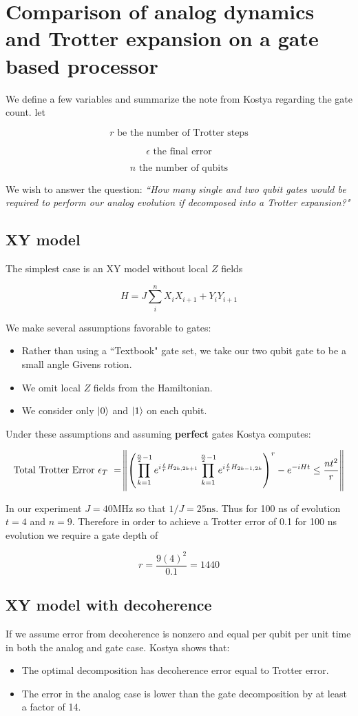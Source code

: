 \documentclass{article}
\DeclareRobustCommand{\qeqn}[1]{
\begin{equation}
    #1
\end{equation}
}
\begin{document}
\section{Comparison of analog dynamics and Trotter expansion on a gate based processor}
We define a few variables and summarize the note from Kostya regarding the gate count.
let
\qeqn{r \text{ be the number of Trotter steps}}
\qeqn{\epsilon \text{ the final error}}
\qeqn{n \text{ the number of qubits}}

We wish to answer the question:
\textit{``How many single and two qubit gates would be required to perform our analog evolution if decomposed into a Trotter expansion?"}

\subsection{XY model}

The simplest case is an XY model without local $Z$ fields
\qeqn{H = J \sum_i^n X_i X_{i+1} + Y_i Y_{i+1} }
We make several assumptions favorable to gates:
\begin{itemize}
\item Rather than using a ``Textbook" gate set, we take our two qubit gate to be a small angle Givens rotion.
\item We omit local $Z$ fields from the Hamiltonian.
\item We consider only $\ket{0}$ and $\ket{1}$ on each qubit.
\end{itemize}
Under these assumptions and assuming \textbf{perfect} gates Kostya computes:
\qeqn{\text{Total Trotter Error $\epsilon_{T}$ } =
\norm{
\left(
\prod_{k=1}^{\frac{n}{2}-1} e^{i \frac{t}{r} H_{2k,2k+1} }
\prod_{k=1}^{\frac{n}{2}-1} e^{i \frac{t}{r} H_{2k-1,2k} }
\right)^{r}
- e^{- i H t}
\leq
\frac{n t^2}{r}
}
}

In our experiment $J = 40 \text{MHz}$ so that $1/J = 25\text{ns}$.
Thus for 100 ns of evolution $t=4$ and $n=9$.
Therefore in order to achieve a Trotter error of 0.1 for 100 ns evolution we require a gate depth of
\qeqn{ r = \frac{9 (4)^2}{0.1} = 1440}

\subsection{XY model with decoherence}
If we assume error from decoherence is nonzero and equal per qubit per unit time in both the analog and gate case.
Kostya shows that:
\begin{itemize}
\item The optimal decomposition has decoherence error equal to Trotter error.
\item The error in the analog case is lower than the gate decomposition by at least a factor of 14.
\end{itemize}
\end{document}
